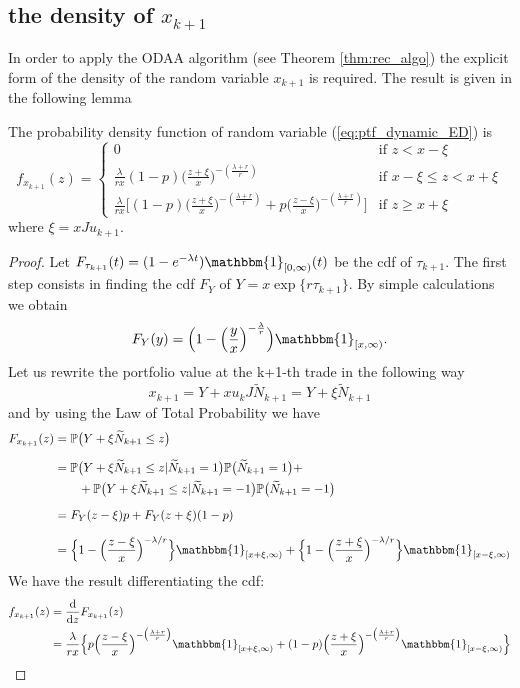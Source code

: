 \subsection{the density of $x_{k+1}$}
In order to apply the ODAA algorithm (see Theorem \ref{thm:rec_algo}) the explicit form of the density of the random variable $x_{k+1}$ is required. The result is given in the following lemma
\begin{lemma}
	The probability density function of random variable (\ref{eq:ptf_dynamic_ED}) is
	\begin{equation*}
	f_{x_{k+1}}(z)= 
	\begin{cases}
	0         & \text{if } z < x-\xi \\[1ex]  
	\frac{\lambda}{r x}(1-p)\big(\frac{z+\xi}{x}\big)^{-(\frac{\lambda+r}{r})} & \text{if } x-\xi \leq z < x+\xi \\[1ex]  
	\frac{\lambda}{r x}\big[(1-p)\big(\frac{z+\xi}{x}\big)^{-(\frac{\lambda+r}{r})} + p \big(\frac{z-\xi}{x}\big)^{-(\frac{\lambda+r}{r})}\big]   & \text{if } z \geq x+\xi
	\end{cases}
	\end{equation*}
	where $\xi=xJu_{k+1}$.
\end{lemma}
\begin{proof}
	Let $F_{\tau_{k+1}}(t)= (1-e^{-\lambda t})\mathbbm{1}_{[0,\infty)}(t)$ be the cdf of $\tau_{k+1}$. The first step consists in finding the cdf $F_Y$ of $Y=x\exp\{r \tau_{k+1}\}$. By simple calculations we obtain
	\[F_Y(y)=\Big(1-\Big(\frac{y}{x}\Big)^{-\frac{\lambda}{r}}\Big)\mathbbm{1}_{[x,\infty)}. \]
	Let us rewrite the portfolio value at the k+1-th trade in the following way \[ x_{k+1} = Y + xu_kJ\widetilde{N}_{k+1}=Y+\xi \widetilde{N}_{k+1} \]
	and by using the Law of Total Probability we have
	\begin{align*}
	F_{x_{k+1}}(z) & = \mathbb{P}\big(Y+\xi \widetilde{N}_{k+1}\leq z\big)\\[1.5ex]
	& = \mathbb{P}\big(Y+\xi \widetilde{N}_{k+1}\leq z\lvert \widetilde{N}_{k+1}=1\big)\mathbb{P}\big(\widetilde{N}_{k+1}=1\big)+\\
	&\qquad +\mathbb{P}\big(Y+\xi \widetilde{N}_{k+1}\leq z\lvert \widetilde{N}_{k+1}=-1\big)\mathbb{P}\big(\widetilde{N}_{k+1}=-1\big)\\[1.5ex]
	& = F_Y(z-\xi)p+F_Y(z+\xi)(1-p)\\[1.5ex]
	& = \Big\{1-\Big(\frac{z-\xi}{x}\Big)^{-\lambda/r} \Big\}\mathbbm{1}_{[x+\xi,\infty)}+
	\Big\{1-\Big(\frac{z+\xi}{x}\Big)^{-\lambda/r} \Big\}\mathbbm{1}_{[x-\xi,\infty)}
	\end{align*}
	We have the result differentiating the cdf:
	\begin{align*}
	f_{x_{k+1}}(z) & = \frac{\mathrm{d}}{\mathrm{d}z}F_{x_{k+1}}(z)\\
	& = \frac{\lambda}{r x}\Big\{p\Big(\frac{z-\xi}{x}\Big)^{-\big(\frac{\lambda+r}{r}\big)}\mathbbm{1}_{[x+\xi,\infty)} + 
	(1-p)\Big(\frac{z+\xi}{x}\Big)^{-\big(\frac{\lambda+r}{r}\big)}\mathbbm{1}_{[x-\xi,\infty)}\Big\}
	\end{align*}
	
	
\end{proof}





